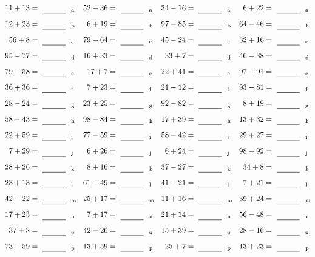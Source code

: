 \documentclass
[
  draft    = true,
  fontsize = 11pt,
  parskip  = half-
]
{scrartcl}
\begin{document}
\clearpage
\begin{align*}
    \pline{11+13}&=\rline{a}
  & \pline{52-36}&=\rline{a}
  & \pline{34-16}&=\rline{a}
  & \pline{6+22}&=\rline{a} \\[1ex]
    \pline{12+23}&=\rline{b}
  & \pline{6+19}&=\rline{b}
  & \pline{97-85}&=\rline{b}
  & \pline{64-46}&=\rline{b} \\[1ex]
    \pline{56+8}&=\rline{c}
  & \pline{79-64}&=\rline{c}
  & \pline{45-24}&=\rline{c}
  & \pline{32+16}&=\rline{c} \\[1ex]
    \pline{95-77}&=\rline{d}
  & \pline{16+33}&=\rline{d}
  & \pline{33+7}&=\rline{d}
  & \pline{46-38}&=\rline{d} \\[1ex]
    \pline{79-58}&=\rline{e}
  & \pline{17+7}&=\rline{e}
  & \pline{22+41}&=\rline{e}
  & \pline{97-91}&=\rline{e} \\[1ex]
    \pline{36+36}&=\rline{f}
  & \pline{7+23}&=\rline{f}
  & \pline{21-12}&=\rline{f}
  & \pline{93-81}&=\rline{f} \\[1ex]
    \pline{28-24}&=\rline{g}
  & \pline{23+25}&=\rline{g}
  & \pline{92-82}&=\rline{g}
  & \pline{8+19}&=\rline{g} \\[1ex]
    \pline{58-43}&=\rline{h}
  & \pline{98-84}&=\rline{h}
  & \pline{17+39}&=\rline{h}
  & \pline{13+32}&=\rline{h} \\[1ex]
    \pline{22+59}&=\rline{i}
  & \pline{77-59}&=\rline{i}
  & \pline{58-42}&=\rline{i}
  & \pline{29+27}&=\rline{i} \\[1ex]
    \pline{7+29}&=\rline{j}
  & \pline{6+26}&=\rline{j}
  & \pline{6+24}&=\rline{j}
  & \pline{98-92}&=\rline{j} \\[1ex]
    \pline{28+26}&=\rline{k}
  & \pline{8+16}&=\rline{k}
  & \pline{37-27}&=\rline{k}
  & \pline{34+8}&=\rline{k} \\[1ex]
    \pline{23+13}&=\rline{l}
  & \pline{61-49}&=\rline{l}
  & \pline{41-21}&=\rline{l}
  & \pline{7+21}&=\rline{l} \\[1ex]
    \pline{42-22}&=\rline{m}
  & \pline{25+17}&=\rline{m}
  & \pline{11+16}&=\rline{m}
  & \pline{39+24}&=\rline{m} \\[1ex]
    \pline{17+23}&=\rline{n}
  & \pline{7+17}&=\rline{n}
  & \pline{21+14}&=\rline{n}
  & \pline{56-48}&=\rline{n} \\[1ex]
    \pline{37+8}&=\rline{o}
  & \pline{42-26}&=\rline{o}
  & \pline{15+39}&=\rline{o}
  & \pline{28-16}&=\rline{o} \\[1ex]
    \pline{73-59}&=\rline{p}
  & \pline{13+59}&=\rline{p}
  & \pline{25+7}&=\rline{p}
  & \pline{13+23}&=\rline{p}
\end{align*}
\end{document}

